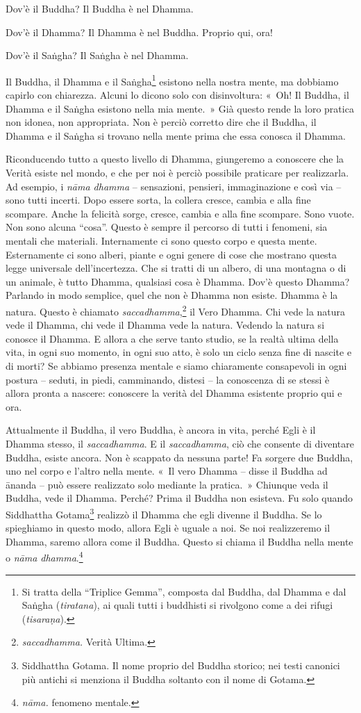 Dov'è il Buddha? Il Buddha è nel Dhamma.

Dov'è il Dhamma? Il Dhamma è nel Buddha. Proprio qui, ora!

Dov'è il Saṅgha? Il Saṅgha è nel Dhamma.

Il Buddha, il Dhamma e il Saṅgha\footnote{Si tratta della ``Triplice
  Gemma'', composta dal Buddha, dal Dhamma e dal Saṅgha
  (\emph{tiratana}), ai quali tutti i buddhisti si rivolgono come a dei
  rifugi (\emph{tisaraṇa}).} esistono nella nostra mente, ma dobbiamo
capirlo con chiarezza. Alcuni lo dicono solo con disinvoltura: «~Oh! Il
Buddha, il Dhamma e il Saṅgha esistono nella mia mente.~» Già questo
rende la loro pratica non idonea, non appropriata. Non è perciò corretto
dire che il Buddha, il Dhamma e il Saṅgha si trovano nella mente prima
che essa conosca il Dhamma.

Riconducendo tutto a questo livello di Dhamma, giungeremo a conoscere
che la Verità esiste nel mondo, e che per noi è perciò possibile
praticare per realizzarla. Ad esempio, i \emph{nāma dhamma} --
sensazioni, pensieri, immaginazione e così via -- sono tutti incerti.
Dopo essere sorta, la collera cresce, cambia e alla fine scompare. Anche
la felicità sorge, cresce, cambia e alla fine scompare. Sono vuote. Non
sono alcuna ``cosa''. Questo è sempre il percorso di tutti i fenomeni,
sia mentali che materiali. Internamente ci sono questo corpo e questa
mente. Esternamente ci sono alberi, piante e ogni genere di cose che
mostrano questa legge universale dell'incertezza. Che si tratti di un
albero, di una montagna o di un animale, è tutto Dhamma, qualsiasi cosa
è Dhamma. Dov'è questo Dhamma? Parlando in modo semplice, quel che non è
Dhamma non esiste. Dhamma è la natura. Questo è chiamato
\emph{saccadhamma},\footnote{\emph{saccadhamma.} Verità Ultima.}
il Vero Dhamma. Chi vede la natura vede il Dhamma, chi
vede il Dhamma vede la natura. Vedendo la natura si conosce il Dhamma. E
allora a che serve tanto studio, se la realtà ultima della vita, in ogni
suo momento, in ogni suo atto, è solo un ciclo senza fine di nascite e
di morti? Se abbiamo presenza mentale e siamo chiaramente consapevoli in
ogni postura -- seduti, in piedi, camminando, distesi -- la conoscenza
di se stessi è allora pronta a nascere: conoscere la verità del Dhamma
esistente proprio qui e ora.

Attualmente il Buddha, il vero Buddha, è ancora in vita, perché Egli è
il Dhamma stesso, il \emph{saccadhamma}. E il \emph{saccadhamma}, ciò
che consente di diventare Buddha, esiste ancora. Non è scappato da
nessuna parte! Fa sorgere due Buddha, uno nel corpo e l'altro nella
mente. «~Il vero Dhamma -- disse il Buddha ad ānanda -- può essere
realizzato solo mediante la pratica.~» Chiunque veda il Buddha, vede il
Dhamma. Perché? Prima il Buddha non esisteva. Fu solo quando Siddhattha
Gotama\footnote{Siddhattha Gotama. Il nome proprio del Buddha storico;
  nei testi canonici più antichi si menziona il Buddha soltanto con il
  nome di Gotama.} realizzò il Dhamma che egli divenne il Buddha. Se lo
spieghiamo in questo modo, allora Egli è uguale a noi. Se noi
realizzeremo il Dhamma, saremo allora come il Buddha. Questo si chiama
il Buddha nella mente o \emph{nāma dhamma}.\footnote{\emph{nāma.}
  fenomeno mentale.}

